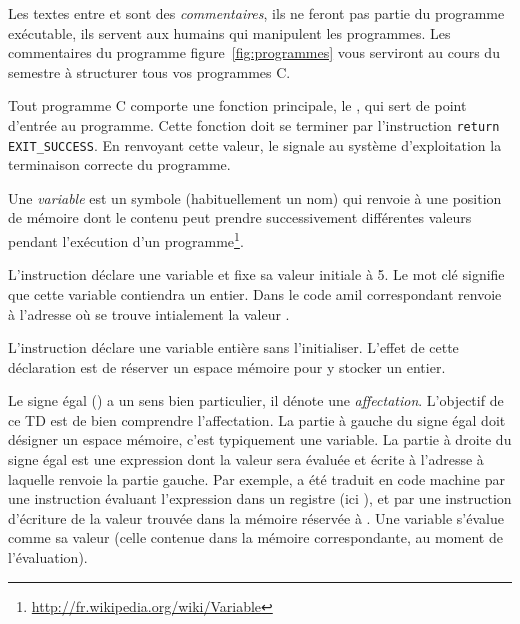 Les textes entre \C{/*} et \C{*/} sont des \emph{commentaires}, ils ne feront pas partie du programme exécutable, ils servent aux humains qui manipulent les programmes. Les commentaires du programme figure~\ref{fig:programmes} vous serviront au cours du semestre à structurer tous vos programmes C.

Tout programme C comporte une fonction principale, le , qui sert de point d'entrée au programme. Cette fonction doit se terminer par l'instruction \verb+return EXIT_SUCCESS+. En renvoyant cette valeur, le  signale au système d'exploitation la terminaison correcte du programme.

Une \emph{variable} est un symbole (habituellement un nom) qui renvoie à une position de mémoire dont le contenu peut prendre successivement différentes valeurs pendant l'exécution d'un programme\footnote{\url{http://fr.wikipedia.org/wiki/Variable}}.

L'instruction  déclare une variable  et fixe sa valeur initiale à 5. Le mot clé  signifie que cette variable contiendra un entier. Dans le code amil correspondant  renvoie à l'adresse  où se trouve intialement la valeur .

L'instruction  déclare une variable entière  sans l'initialiser. L'effet de cette déclaration est de réserver un espace mémoire pour y stocker un entier. 

Le signe égal (\C{=}) a un sens bien particulier, il dénote une \emph{affectation}. L'objectif de ce TD est de bien comprendre l'affectation.  La partie à gauche du signe égal doit désigner un espace mémoire, c'est typiquement une variable. La partie à droite du signe égal est une expression dont la valeur sera évaluée et écrite à l'adresse à laquelle renvoie la partie gauche. Par exemple,  a été traduit en code machine par une instruction évaluant l'expression  dans un registre (ici ), et par une instruction d'écriture de la valeur trouvée dans la mémoire réservée à . Une variable s'évalue comme sa valeur (celle contenue dans la mémoire correspondante, au moment de l'évaluation).

